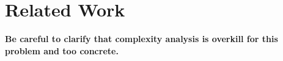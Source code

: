 \section{Related Work}\label{sec:related}
%
\textbf{Be careful to clarify that complexity analysis is overkill for
this problem and too concrete.}
